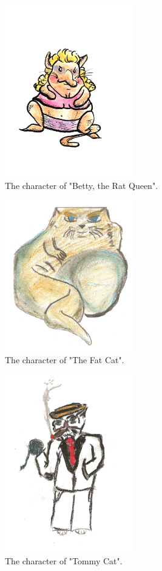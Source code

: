 \documentclass[12pt]{IEEEtran}
\begin{document}
	\begin{figure}[h]
		\centering
		\includegraphics[width=0.5\textwidth]{Rat_Betty.jpg}
		\caption{The character of "Betty, the Rat Queen".}
		\label{fig:betty}
	\end{figure}
	
	\begin{figure}[h]
		\centering
		\includegraphics[width=0.5\textwidth]{fat_cat.jpg}
		\caption{The character of "The Fat Cat".}
		\label{fig:fat}
	\end{figure}

	\begin{figure}[h]
		\centering
		\includegraphics[width=0.5\textwidth]{tommy_cat.jpg}
		\caption{The character of "Tommy Cat".}
		\label{fig:tommy}
	\end{figure}
	
\end{document}
